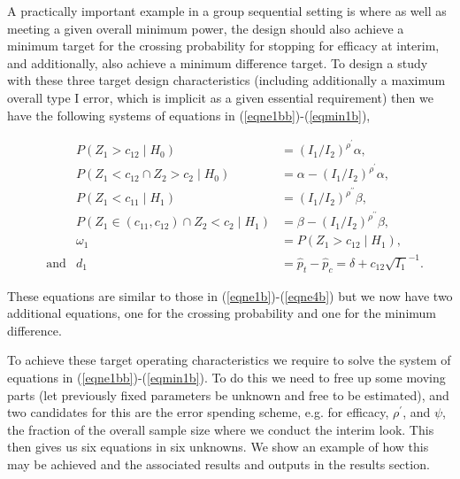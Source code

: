 \documentclass{article}
\begin{document}
A practically important example in a group sequential setting is where as well as meeting a given overall minimum power, the design should also achieve a minimum target for the crossing probability for stopping for efficacy at interim, and additionally, also achieve a minimum difference target. To design a study with these three target design characteristics (including additionally a maximum overall type I error, which is implicit as a given essential requirement) then we have the following systems of equations in (\ref{eqne1bb})-(\ref{eqmin1b}), 
 \begin{fleqn}
\begin{align}
&&P(Z_{1}>c_ {12}\mid{H_ 0})&=(I_ {1}/I_{2})^{\rho^\prime} \alpha,\label{eqne1bb}\\[2pt]
&&P(Z_{1}<c_ {12} \cap Z_{2}>c_ {2}\mid{H_ 0})&=\alpha -(I_ {1}/I_{2})^{\rho^\prime}\alpha,\label{eqne2bb}\\[2pt]
&&P(Z_{1}<c_ {11}\mid{H_ 1})&=(I_ {1}/I_{2})^{\rho^{\prime\prime}} \beta,\label{eqne3bb}\\[2pt]
&&P(Z_ {1}\in(c_{11},c_{12}) \cap Z_{2}<c_ {2}\mid{H_ 1})&=\beta -(I_ {1}/I_{2})^{\rho^{\prime\prime}}\beta,\label{eqne4bb}\\
&&\omega_1&=P(Z_{1}>c_{12}\mid{H_1}),\label{c1b}\\
&\text{and}&d_1&=\hat{p}_t-\hat{p}_c= \delta+ c_{12} \sqrt{I_{1}}^{-1}.\label{eqmin1b}
\end{align}
\end{fleqn}
These equations are similar to those in (\ref{eqne1b})-(\ref{eqne4b}) but we now have two additional equations, one for the crossing probability and one for the minimum difference. 


To achieve these target operating characteristics we require to solve the system of equations in (\ref{eqne1bb})-(\ref{eqmin1b}). To do this we need to free up some moving parts (let previously fixed parameters be unknown and free to be estimated), and two candidates for this are the error spending scheme, e.g. for efficacy, $\rho^\prime$, and $\psi$, the fraction of the overall sample size where we conduct the interim look. This then gives us six equations in six unknowns. We show an example of how this may be achieved and the associated results and outputs in the results section.
\end{document}
